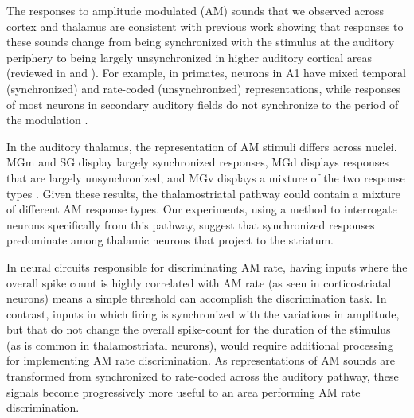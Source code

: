 The responses to amplitude modulated (AM) sounds that we observed across cortex and thalamus are consistent with previous work showing that responses to these sounds change from being synchronized with the stimulus at the auditory periphery to being largely unsynchronized in higher auditory cortical areas (reviewed in \cite{Joris2004} and \cite{Wang2008}). 
%
For example, in primates, neurons in A1 have mixed temporal (synchronized) and rate-coded (unsynchronized) representations, while responses of most neurons in secondary auditory fields do not synchronize to the period of the modulation \citep{Bendor2007, Niwa2013}.

In the auditory thalamus, the representation of AM stimuli differs across nuclei. 
%
MGm and SG display largely synchronized responses, MGd displays responses that are largely unsynchronized, and MGv displays a mixture of the two response types \citep{Bartlett2013}. 
%
Given these results, the thalamostriatal pathway could contain a mixture of different AM response types. 
%
Our experiments, using a method to interrogate neurons specifically from this pathway, suggest that synchronized responses predominate among thalamic neurons that project to the striatum.

In neural circuits responsible for discriminating AM rate, having inputs where the overall spike count is highly correlated with AM rate (as seen in corticostriatal neurons) means a simple threshold can accomplish the discrimination task. 
%
In contrast, inputs in which firing is synchronized with the variations in amplitude, but that do not change the overall spike-count for the duration of the stimulus (as is common in thalamostriatal neurons), would require additional processing for implementing AM rate discrimination.
%
As representations of AM sounds are transformed from synchronized to rate-coded across the auditory pathway, these signals become progressively more useful to an area performing AM rate discrimination.

